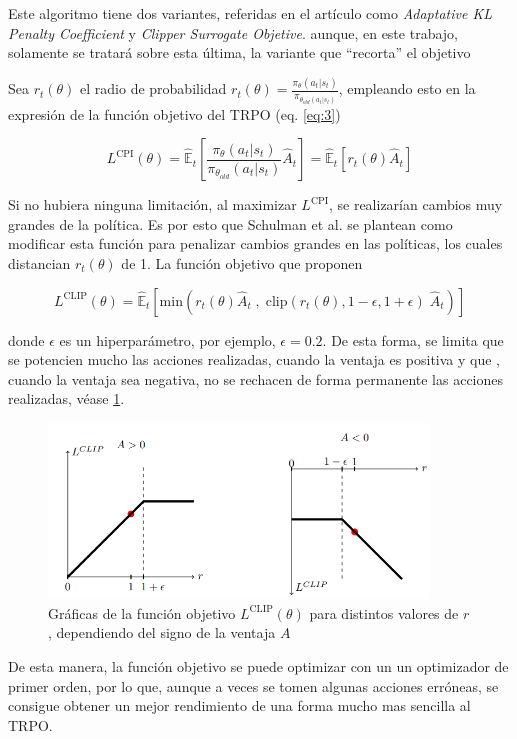 Este algoritmo tiene dos variantes, referidas en el artículo \cite{schulman2017proximal} como \textit{Adaptative KL Penalty Coefficient} y \textit{Clipper Surrogate Objetive}. aunque, en este trabajo, solamente se tratará sobre esta última, la variante que ``recorta'' el objetivo 

Sea $r_t(\theta)$ el radio de probabilidad $r_t(\theta) = \frac{\pi_{\theta}(a_t|s_t)}{\pi_{\theta_{old}(a_t|s_t)}}$, empleando esto en la expresión de la función objetivo del TRPO (eq. \ref{eq:3})

\begin{equation}
	L^{\text{CPI}}	(\theta)={\mathbb{\hat E}_t} \left[ \frac{\pi_\theta (a_t|s_t)}{\pi_{\theta_{old}} (a_t|s_t)} \hat{A}_t\right]
	= 	{\mathbb{\hat E}_t} \left[ r_t(\theta)\hat{A}_t\right]
\end{equation}

Si no hubiera ninguna limitación, al maximizar $L^{\text{CPI}}$, se realizarían cambios muy grandes de la política. Es por esto que Schulman et al. se plantean como modificar esta función para penalizar cambios grandes en las políticas, los cuales distancian $r_t(\theta)$ de 1. La función objetivo que proponen

\begin{equation}
	L^{\text{CLIP}}	(\theta) = 	{\mathbb{\hat E}_t} \left[ \text{min} \left(r_t(\theta)\hat{A}_t \;,\; \text{clip}(r_t(\theta),1-\epsilon,1+\epsilon )\;\hat{A}_t \right) \right]
\end{equation}

donde $\epsilon$ es un hiperparámetro, por ejemplo, $\epsilon = 0.2$. De esta forma, se limita que se potencien mucho las acciones realizadas, cuando la ventaja es positiva y que , cuando la ventaja sea negativa, no se rechacen de forma permanente las acciones realizadas, véase \cref{ppo_clip}.
\begin{figure}[htb!]
	\centering
	\includegraphics[width=0.9\textwidth]{background/ppo_clip}
	\caption{Gráficas de la función objetivo $L^{\text{CLIP}}(\theta)$ para distintos valores de $r$, dependiendo del signo de la ventaja $A$}
	\label{ppo_clip}
\end{figure}

De esta manera, la función objetivo se puede optimizar con un un optimizador de primer orden, por lo que, aunque a veces se tomen algunas acciones erróneas, se consigue obtener un mejor rendimiento de una forma mucho mas sencilla al TRPO.
